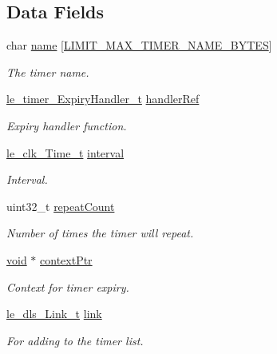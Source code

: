 \subsection*{Data Fields}
\begin{DoxyCompactItemize}
\item 
char \hyperlink{struct_timer__t_ac3cb8749c91ad906f50ad049447720c8}{name} \mbox{[}\hyperlink{limit_8h_a33a3d0f77fab523550e641240420a904}{L\+I\+M\+I\+T\+\_\+\+M\+A\+X\+\_\+\+T\+I\+M\+E\+R\+\_\+\+N\+A\+M\+E\+\_\+\+B\+Y\+T\+ES}\mbox{]}
\begin{DoxyCompactList}\small\item\em The timer name. \end{DoxyCompactList}\item 
\hyperlink{le__timer_8h_a81ec5f8df2fbde873566e55489d8cedd}{le\+\_\+timer\+\_\+\+Expiry\+Handler\+\_\+t} \hyperlink{struct_timer__t_aba3262b93cf1c2493362ffcb6d04d0d5}{handler\+Ref}
\begin{DoxyCompactList}\small\item\em Expiry handler function. \end{DoxyCompactList}\item 
\hyperlink{structle__clk___time__t}{le\+\_\+clk\+\_\+\+Time\+\_\+t} \hyperlink{struct_timer__t_a05056a263e574c85a22f4df9f777c095}{interval}
\begin{DoxyCompactList}\small\item\em Interval. \end{DoxyCompactList}\item 
uint32\+\_\+t \hyperlink{struct_timer__t_a0f131253258fae2014ea54c09b34b21c}{repeat\+Count}
\begin{DoxyCompactList}\small\item\em Number of times the timer will repeat. \end{DoxyCompactList}\item 
\hyperlink{_t_e_m_p_l_a_t_e__cdef_8h_ac9c84fa68bbad002983e35ce3663c686}{void} $\ast$ \hyperlink{struct_timer__t_ac86f7b42e9ab20824f12d9fedbbba135}{context\+Ptr}
\begin{DoxyCompactList}\small\item\em Context for timer expiry. \end{DoxyCompactList}\item 
\hyperlink{structle__dls___link__t}{le\+\_\+dls\+\_\+\+Link\+\_\+t} \hyperlink{struct_timer__t_aa089c17b518972d155f8430302933af0}{link}
\begin{DoxyCompactList}\small\item\em For adding to the timer list. \end{DoxyCompactList}\item 

\end{DoxyCompactItemize}
